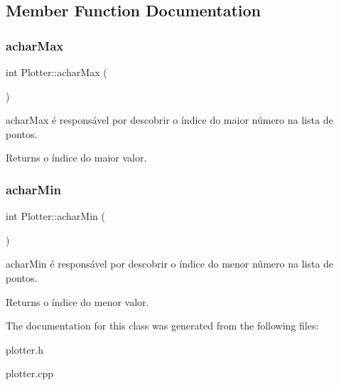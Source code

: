 \subsection{Member Function Documentation}
\mbox{\label{class_plotter_afb07f973b72d7ff1d8a03694e149d244}} 
\subsubsection{\texorpdfstring{achar\+Max}{acharMax}}
{\footnotesize\ttfamily int Plotter\+::achar\+Max (\begin{DoxyParamCaption}{ }\end{DoxyParamCaption})\hspace{0.3cm}{\ttfamily [slot]}}



achar\+Max é responsável por descobrir o índice do maior número na lista de pontos. 

\begin{DoxyReturn}{Returns}
o índice do maior valor. 
\end{DoxyReturn}
\mbox{\label{class_plotter_a9d560ccf5a5192345108a92ab2557369}} 
\subsubsection{\texorpdfstring{achar\+Min}{acharMin}}
{\footnotesize\ttfamily int Plotter\+::achar\+Min (\begin{DoxyParamCaption}{ }\end{DoxyParamCaption})\hspace{0.3cm}{\ttfamily [slot]}}



achar\+Min é responsável por descobrir o índice do menor número na lista de pontos. 

\begin{DoxyReturn}{Returns}
o índice do menor valor. 
\end{DoxyReturn}


The documentation for this class was generated from the following files\+:\begin{DoxyCompactItemize}
\item 
plotter.\+h\item 
plotter.\+cpp\end{DoxyCompactItemize}
